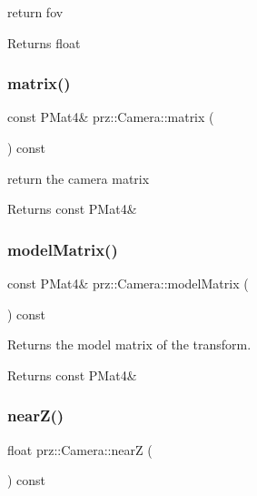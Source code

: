 return fov 

\begin{DoxyReturn}{Returns}
float 
\end{DoxyReturn}
\mbox{\label{classprz_1_1_camera_a73be3bc102f3acaaf4abb4893dd3856f}} 
\subsubsection{\texorpdfstring{matrix()}{matrix()}}
{\footnotesize\ttfamily const P\+Mat4\& prz\+::\+Camera\+::matrix (\begin{DoxyParamCaption}{ }\end{DoxyParamCaption}) const\hspace{0.3cm}{\ttfamily [inline]}}



return the camera matrix 

\begin{DoxyReturn}{Returns}
const P\+Mat4\& 
\end{DoxyReturn}
\mbox{\label{classprz_1_1_camera_a2fab4f93dddff59ac8cd877f58bd4153}} 
\subsubsection{\texorpdfstring{modelMatrix()}{modelMatrix()}}
{\footnotesize\ttfamily const P\+Mat4\& prz\+::\+Camera\+::model\+Matrix (\begin{DoxyParamCaption}{ }\end{DoxyParamCaption}) const\hspace{0.3cm}{\ttfamily [inline]}}



Returns the model matrix of the transform. 

\begin{DoxyReturn}{Returns}
const P\+Mat4\& 
\end{DoxyReturn}
\mbox{\label{classprz_1_1_camera_ac8796588065240fa2e73dccad3f5d858}} 
\subsubsection{\texorpdfstring{nearZ()}{nearZ()}}
{\footnotesize\ttfamily float prz\+::\+Camera\+::nearZ (\begin{DoxyParamCaption}{ }\end{DoxyParamCaption}) const\hspace{0.3cm}{\ttfamily [inline]}}



